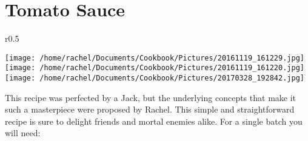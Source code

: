 \documentclass{article}
\begin{document}
\section*{\fontsize{25}{15}\selectfont Tomato Sauce}

\begin{wrapfigure}{r}{0.5\textwidth}
\
  \begin{center}
 	\hfill\begin{minipage}{.5\textwidth}\centering
 	\vspace*{-5cm}
		\texttt{[image: /home/rachel/Documents/Cookbook/Pictures/20161119\_161229.jpg]}
		\\[5mm]
		\texttt{[image: /home/rachel/Documents/Cookbook/Pictures/20161119\_161220.jpg]}
		\texttt{[image: /home/rachel/Documents/Cookbook/Pictures/20170328\_192842.jpg]}
	\end{minipage}  
	\end{center}

\end{wrapfigure}



\vspace{10mm}

This recipe was perfected by a Jack, but the underlying concepts that make it such a masterpiece were proposed by Rachel. This simple and straightforward recipe is sure to delight friends and mortal enemies alike. For a single batch you will need:
\end{document}
